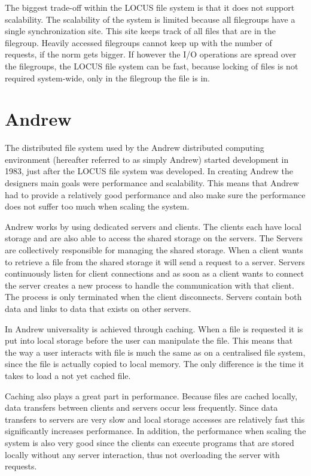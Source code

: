 \documentclass[a4paper,12px]{article}
\begin{document}
The biggest trade-off within the LOCUS file system is that it does not support
scalability. The scalability of the system is limited because all filegroups
have a single synchronization site. This site keeps track of all files that are
in the filegroup. Heavily accessed filegroups cannot keep up with the number of
requests, if the norm gets bigger. If however the I/O operations are spread over
the filegroups, the LOCUS file system can be fast, because locking of files is
not required system-wide, only in the filegroup the file is in. \cite{concepts}


\section{Andrew}

The distributed file system used by the Andrew distributed computing environment
(hereafter referred to as simply Andrew) started development in 1983, just after
the LOCUS file system was developed. In creating Andrew the designers main goals
were performance and scalability. This means that Andrew had to provide a
relatively good performance and also make sure the performance does not suffer
too much when scaling the system.\cite{andrew}

Andrew works by using dedicated servers and clients. The clients each have local
storage and are also able to access the shared storage on the servers. The
Servers are collectively responsible for managing the shared
storage.\cite{concepts} When a client wants to retrieve a file from the shared
storage it will send a request to a server. Servers continuously listen for
client connections and as soon as a client wants to connect the server creates a
new process to handle the communication with that client. The process is only
terminated when the client disconnects.\cite{andrew} Servers contain both data
and links to data that exists on other servers.

In Andrew universality is achieved through caching. When a file is requested it
is put into local storage before the user can manipulate the file. This means
that the way a user interacts with file is much the same as on a centralised
file system, since the file is actually copied to local memory. The only
difference is the time it takes to load a not yet cached file.\cite{concepts}

Caching also plays a great part in performance. Because files are cached
locally, data transfers between clients and servers occur less frequently. Since
data transfers to servers are very slow and local storage accesses are
relatively fast this significantly increases performance. In addition, the
performance when scaling the system is also very good since the clients can
execute programs that are stored locally without any server interaction, thus
not overloading the server with requests.\cite{andrew}
\end{document}
